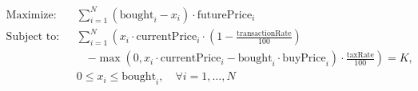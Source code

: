 \documentclass{article}
\begin{document}
\begin{align*}
\text{Maximize:} \quad & \sum_{i=1}^{N} (\text{bought}_i - x_i) \cdot \text{futurePrice}_i \\
\text{Subject to:} \quad & \sum_{i=1}^{N} \left( x_i \cdot \text{currentPrice}_i \cdot (1 - \frac{\text{transactionRate}}{100}) \right. \\ 
& \quad \left. - \max(0, x_i \cdot \text{currentPrice}_i - \text{bought}_i \cdot \text{buyPrice}_i) \cdot \frac{\text{taxRate}}{100} \right) = K, \\
& 0 \leq x_i \leq \text{bought}_i, \quad \forall i = 1, \ldots, N
\end{align*}
\end{document}
